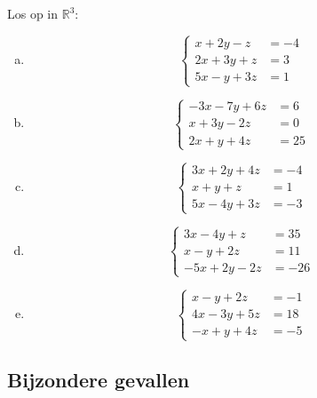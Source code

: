 \documentclass[12pt,twoside]{article}
\begin{document}
\begin{oefening}
Los op in $\mathbb{R}^3$:
\begin{multicols}{2}
\begin{enumerate}[(a)]
  \item$$\left\{
\begin{aligned}
  x + 2y -z &= -4\\
  2x+3y+z   &= 3\\
  5x-y+3z   &= 1
\end{aligned}\right.$$
  \item$$\left\{
\begin{aligned}
  -3x -7y +6z &= 6\\
  x+3y-2z   &= 0\\
  2x+y+4z   &= 25
\end{aligned}\right.$$
  \item$$\left\{
\begin{aligned}
  3x +2y +4z &= -4\\
  x+y+z   &= 1\\
  5x-4y+3z   &= -3
\end{aligned}\right.$$
  \item$$\left\{
\begin{aligned}
  3x -4y +z &= 35\\
  x-y+2z   &= 11\\
  -5x+2y-2z   &= -26
\end{aligned}\right.$$
  \item$$\left\{
\begin{aligned}
  x -y + 2z &= -1\\
  4x-3y+5z   &= 18\\
  -x+y+4z   &= -5
\end{aligned}\right.$$
\end{enumerate}
\end{multicols}
\end{oefening}

\subsection{Bijzondere gevallen}
\end{document}
